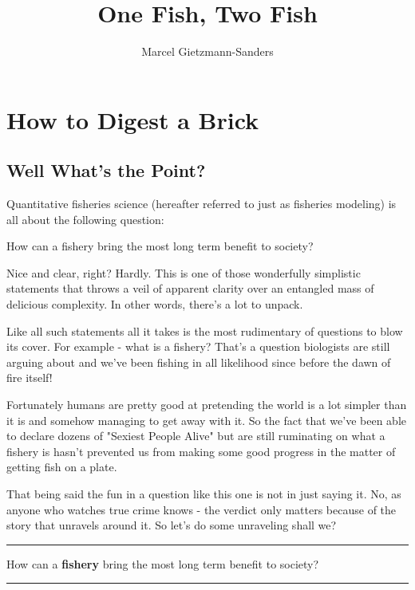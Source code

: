 \documentclass[11pt,a5paper]{book}
\title{One Fish, Two Fish}
\author{Marcel Gietzmann-Sanders}
\date{}
\begin{document}
\maketitle
\tableofcontents
\newpage
\chapter{How to Digest a Brick}

\section{Well What's the Point?}

Quantitative fisheries science (hereafter referred to just as fisheries modeling) is all about the following question:
\newline

 \hangindent=1cm \noindent How can a fishery bring the most long term benefit to society?
\newline

Nice and clear, right? Hardly. This is one of those wonderfully simplistic statements that throws a veil of apparent clarity over an entangled mass of delicious complexity. In other words, there's a lot to unpack.
\newline

Like all such statements all it takes is the most rudimentary of questions to blow its cover. For example - what is a fishery? That's a question biologists are still arguing about and we've been fishing in all likelihood since before the dawn of fire itself! 
\newline

Fortunately humans are pretty good at pretending the world is a lot simpler than it is and somehow managing to get away with it. So the fact that we've been able to declare dozens of "Sexiest People Alive" but are still ruminating on what a fishery is hasn't prevented us from making some good progress in the matter of getting fish on a plate. 
\newline

That being said the fun in a question like this one is not in just saying it. No, as anyone who watches true crime knows - the verdict only matters because of the story that unravels around it. 
So let's do some unraveling shall we? 
\newpage

\noindent \rule{\textwidth}{0.5pt} 
\noindent How can a \textbf{fishery} bring the most long term benefit to society?
\newline
\rule{\textwidth}{0.5pt} 
\vspace{5pt}
\end{document}
